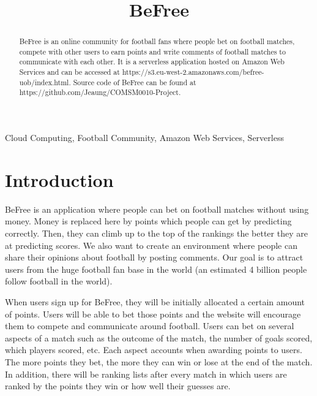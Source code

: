 \documentclass[conference]{IEEEtran}
\begin{document}
\title{BeFree\\}

\author{
\and
{}
}

\maketitle

\begin{abstract}
BeFree is an online community for football fans where
people bet on football matches, compete with other users
to earn points and write comments of football matches to communicate with each other. It is a serverless application hosted on Amazon Web Services and can be accessed at https://s3.eu-west-2.amazonaws.com/befree-uob/index.html. Source code of BeFree can be found at https://github.com/Jeaung/COMSM0010-Project.
\end{abstract}

\begin{IEEEkeywords}
Cloud Computing, Football Community, Amazon Web Services, Serverless
\end{IEEEkeywords}

\section{Introduction}
BeFree is an application where people can bet on football
matches without using money. Money is replaced here by
points which people can get by predicting correctly. Then,
they can climb up to the top of the rankings the better they
are at predicting scores. We also want to create an environment
where people can share their opinions about football by
posting comments. Our goal is to attract users from the huge football
fan base in the world (an estimated 4 billion people follow
football in the world).

When users sign up for BeFree, they will be initially
allocated a certain amount of points. Users will be able to bet
those points and the website will encourage them to compete
and communicate around football. Users can bet on several
aspects of a match such as the outcome of the match, the
number of goals scored, which players scored, etc. Each aspect
accounts when awarding points to users. The more points they
bet, the more they can win or lose at the end of the match.
In addition, there will be ranking lists after every match in
which users are ranked by the points they win or how well
their guesses are.
\end{document}

